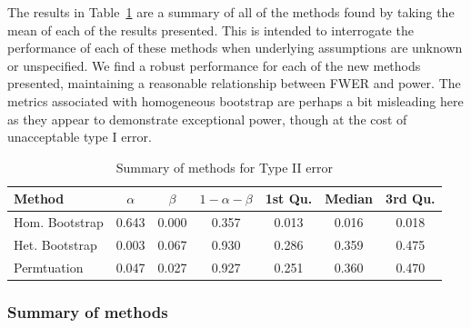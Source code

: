 \documentclass{article}
\begin{document}
The results in Table~\ref{tab:type_2_summary} are a summary of all of the methods found by taking the mean of each of the results presented. This is intended to interrogate the performance of each of these methods when underlying assumptions are unknown or unspecified. We find a robust performance for each of the new methods presented, maintaining a reasonable relationship between FWER and power. The metrics associated with homogeneous bootstrap are perhaps a bit misleading here as they appear to demonstrate exceptional power, though at the cost of unacceptable type I error.

\begin{table}[ht]
\centering
\begin{tabular}{lcccccc}
  \hline
Method & $\alpha$ & $\beta$ & $1 - \alpha - \beta$ & 1st Qu. & Median & 3rd Qu. \\ 
  \hline
Hom. Bootstrap & 0.643 & 0.000 & 0.357 & 0.013 & 0.016 & 0.018 \\ 
  Het. Bootstrap & 0.003 & 0.067 & 0.930 & 0.286 & 0.359 & 0.475 \\ 
  Permtuation & 0.047 & 0.027 & 0.927 & 0.251 & 0.360 & 0.470 \\ 
   \hline
\end{tabular}
\caption{Summary of methods for Type II error} 
\label{tab:type_2_summary}
\end{table}

\subsubsection{Summary of methods}
\end{document}
